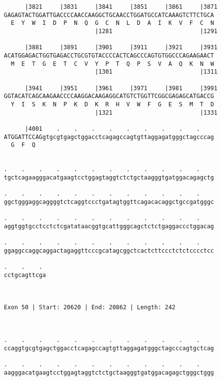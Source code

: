 \documentclass{article}
\begin{document}
\begin{Verbatim}
      |3821     |3831     |3841     |3851     |3861     |3871
GAGAGTACTGGATTGACCCCAACCAAGGCTGCAACCTGGATGCCATCAAAGTCTTCTGCA
  E  Y  W  I  D  P  N  Q  G  C  N  L  D  A  I  K  V  F  C  N
                          |1281                         |1291
  
      |3881     |3891     |3901     |3911     |3921     |3931
ACATGGAGACTGGTGAGACCTGCGTGTACCCCACTCAGCCCAGTGTGGCCCAGAAGAACT
  M  E  T  G  E  T  C  V  Y  P  T  Q  P  S  V  A  Q  K  N  W
                          |1301                         |1311
  
      |3941     |3951     |3961     |3971     |3981     |3991
GGTACATCAGCAAGAACCCCAAGGACAAGAGGCATGTCTGGTTCGGCGAGAGCATGACCG
  Y  I  S  K  N  P  K  D  K  R  H  V  W  F  G  E  S  M  T  D
                          |1321                         |1331
  
      |4001    .    .    .    .    .    .    .    .    .    
ATGGATTCCAGgtgcgtgagctggacctcagagccagtgttaggagatgggctagcccag
  G  F  Q                                                   
                                                            
  
.    .    .    .    .    .    .    .    .    .    .    .    
tgctcagaagggacatgaagtcctggagtaggtctctgctaagggtgatggacagagctg
                                                            
.    .    .    .    .    .    .    .    .    .    .    .    
ggctgggaggcaggggtctcaggtccctgatagtggttcagacacaggctgccgatgggc
                                                            
.    .    .    .    .    .    .    .    .    .    .    .    
aggtggtgcctcctctcgatataacggtgcattgggcagctctctgaggaccctggacag
                                                            
.    .    .    .    .    .    .    .    .    .    .    .    
ggaggccaggcaggactagaggttcccgcatagcggctcactcttccctctctcccctcc
                                                            
.    .    . 
cctgcagttcga
            
            
 
Exon 50 | Start: 20620 | End: 20862 | Length: 242



.    .    .    .    .    .    .    .    .    .    .    .    
ccaggtgcgtgagctggacctcagagccagtgttaggagatgggctagcccagtgctcag
                                                            
.    .    .    .    .    .    .    .    .    .    .    .    
aagggacatgaagtcctggagtaggtctctgctaagggtgatggacagagctgggctggg
                                                            

\end{Verbatim}
\end{document}

